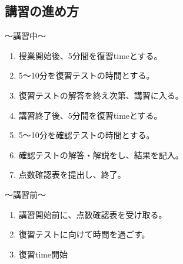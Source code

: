   \subsection{\textbf{講習の進め方}}
  〜講習中〜
    \begin{enumerate}
      \item 授業開始後、5分間を復習timeとする。
      \item 5〜10分を復習テストの時間とする。
      \item 復習テストの解答を終え次第、講習に入る。
      \item 講習終了後、5分間を復習timeとする。
      \item 5〜10分を確認テストの時間とする。
      \item 確認テストの解答・解説をし、結果を記入。
      \item 点数確認表を提出し、終了。
    \end{enumerate}
    \vspace{1em}
  〜講習前〜
    \begin{enumerate}
        \item 講習開始前に、点数確認表を受け取る。
        \item 復習テストに向けて時間を過ごす。
        \item 復習time開始
      \end{enumerate}
      \vspace{1em}
